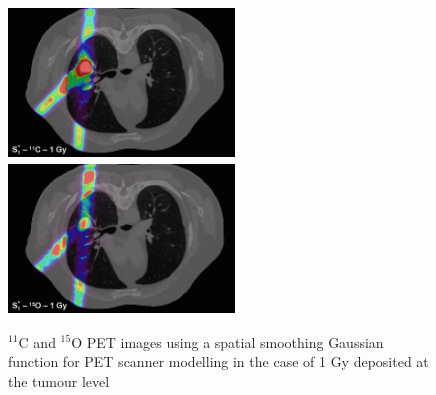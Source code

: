 \documentclass[11pt]{iopart}
\begin{document}
\begin{figure}[!h]
\centering
\includegraphics[width=6cm,height=40mm]{figures/gaussPET_C11_v1.jpg}
\includegraphics[width=6cm,height=40mm]{figures/gaussPET_O15_v1.jpg}
\caption{$^{11}$C and $^{15}$O PET images using a spatial smoothing Gaussian function for PET scanner modelling in the case of 1 Gy deposited at the tumour level}
\label{fig:fig2}
\end{figure}
\end{document}
